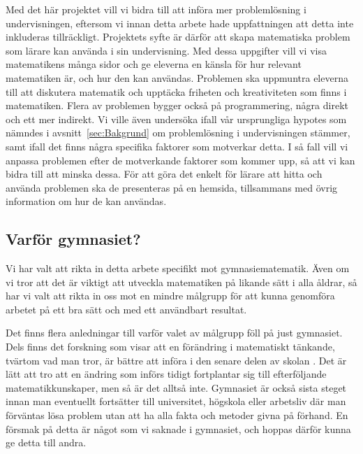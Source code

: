 \textcolor{lila}{Med det här projektet vill vi bidra till att införa mer problemlösning i undervisningen, eftersom vi innan detta arbete hade uppfattningen att detta inte inkluderas tillräckligt. Projektets syfte är därför att skapa matematiska problem som lärare kan använda i sin undervisning. Med dessa uppgifter vill vi visa matematikens många sidor och ge eleverna en känsla för hur relevant matematiken är, och hur den kan användas. Problemen ska uppmuntra eleverna till att diskutera matematik och upptäcka friheten och kreativiteten som finns i matematiken. Flera av problemen bygger också på programmering, några direkt och ett mer indirekt. Vi ville även undersöka ifall vår ursprungliga hypotes som nämndes i avsnitt~\ref{sec:Bakgrund} om problemlösning i undervisningen stämmer, samt ifall det finns några specifika faktorer som motverkar detta. I så fall vill vi anpassa problemen efter de motverkande faktorer som kommer upp, så att vi kan bidra till att minska dessa. För att göra det enkelt för lärare att hitta och använda problemen ska de presenteras på en hemsida, tillsammans med övrig information om hur de kan användas.}


\subsection{Varför gymnasiet?}
\textcolor{lila}{
    Vi har valt att rikta in detta arbete specifikt mot gymnasiematematik. Även om vi tror att det är viktigt att utveckla matematiken på likande sätt i alla åldrar, så har vi valt att rikta in oss mot en mindre målgrupp för att kunna genomföra arbetet på ett bra sätt och med ett användbart resultat. }
    
\textcolor{lila}{
    Det finns flera anledningar till varför valet av målgrupp föll på just gymnasiet. Dels finns det forskning som visar att en förändring i matematiskt tänkande, tvärtom vad man tror, är bättre att införa i den senare delen av skolan \cite{TheElephant}. Det är lätt att tro att en ändring som införs tidigt fortplantar sig till efterföljande matematikkunskaper, men så är det alltså inte. Gymnasiet är också sista steget innan man eventuellt fortsätter till universitet, högskola eller arbetsliv där man förväntas lösa problem utan att ha alla fakta och metoder givna på förhand. En försmak på detta är något som vi saknade i gymnasiet, och hoppas därför kunna ge detta till andra.}
    
